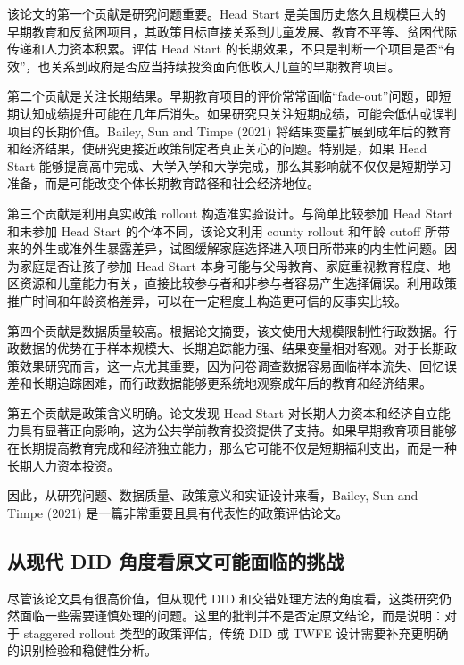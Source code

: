 \documentclass[
  fontset=windows]{ctexart}
\begin{document}
该论文的第一个贡献是研究问题重要。Head Start
是美国历史悠久且规模巨大的早期教育和反贫困项目，其政策目标直接关系到儿童发展、教育不平等、贫困代际传递和人力资本积累。评估
Head Start
的长期效果，不只是判断一个项目是否``有效''，也关系到政府是否应当持续投资面向低收入儿童的早期教育项目。

第二个贡献是关注长期结果。早期教育项目的评价常常面临``fade-out''问题，即短期认知成绩提升可能在几年后消失。如果研究只关注短期成绩，可能会低估或误判项目的长期价值。Bailey,
Sun and Timpe (2021)
将结果变量扩展到成年后的教育和经济结果，使研究更接近政策制定者真正关心的问题。特别是，如果
Head Start
能够提高高中完成、大学入学和大学完成，那么其影响就不仅仅是短期学习准备，而是可能改变个体长期教育路径和社会经济地位。

第三个贡献是利用真实政策 rollout 构造准实验设计。与简单比较参加 Head
Start 和未参加 Head Start 的个体不同，该论文利用 county rollout 和年龄
cutoff
所带来的外生或准外生暴露差异，试图缓解家庭选择进入项目所带来的内生性问题。因为家庭是否让孩子参加
Head Start
本身可能与父母教育、家庭重视教育程度、地区资源和儿童能力有关，直接比较参与者和非参与者容易产生选择偏误。利用政策推广时间和年龄资格差异，可以在一定程度上构造更可信的反事实比较。

第四个贡献是数据质量较高。根据论文摘要，该文使用大规模限制性行政数据。行政数据的优势在于样本规模大、长期追踪能力强、结果变量相对客观。对于长期政策效果研究而言，这一点尤其重要，因为问卷调查数据容易面临样本流失、回忆误差和长期追踪困难，而行政数据能够更系统地观察成年后的教育和经济结果。

第五个贡献是政策含义明确。论文发现 Head Start
对长期人力资本和经济自立能力具有显著正向影响，这为公共学前教育投资提供了支持。如果早期教育项目能够在长期提高教育完成和经济独立能力，那么它可能不仅是短期福利支出，而是一种长期人力资本投资。

因此，从研究问题、数据质量、政策意义和实证设计来看，Bailey, Sun and
Timpe (2021) 是一篇非常重要且具有代表性的政策评估论文。

\subsection{从现代 DID
角度看原文可能面临的挑战}\label{ux4eceux73b0ux4ee3-did-ux89d2ux5ea6ux770bux539fux6587ux53efux80fdux9762ux4e34ux7684ux6311ux6218}

尽管该论文具有很高价值，但从现代 DID
和交错处理方法的角度看，这类研究仍然面临一些需要谨慎处理的问题。这里的批判并不是否定原文结论，而是说明：对于
staggered rollout 类型的政策评估，传统 DID 或 TWFE
设计需要补充更明确的识别检验和稳健性分析。
\end{document}
